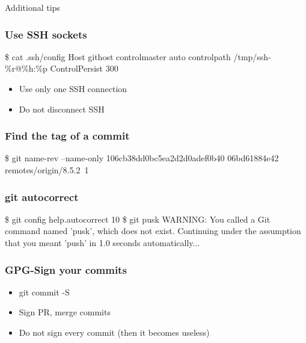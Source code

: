 
\begin{frame}
    \begin{center}
        \Huge{Additional tips}
    \end{center}
\end{frame}
\begin{frame}[fragile]
    \frametitle{Use SSH sockets}
\begin{block}{}\begin{semiverbatim}
\$ cat {}.ssh/config
Host githost
    controlmaster auto
    controlpath /tmp/ssh-\%r@\%h:\%p
    ControlPersist 300
\end{semiverbatim}\end{block}
    \begin{itemize}
        \item Use only one SSH connection
        \item Do not disconnect SSH
    \end{itemize}
\end{frame}
\begin{frame}[fragile]
    \frametitle{Find the tag of a commit}

\begin{block}{}\begin{semiverbatim}
\$ git name-rev --name-only 106cb38dd0bc5ea2d2d0adef0b40
06bd61884e42
\color{lightgrey}remotes/origin/8.5.2~1
\end{semiverbatim}\end{block}
\end{frame}
\begin{frame}[fragile]
    \frametitle{git autocorrect}
\begin{block}{}\begin{semiverbatim}
\$ git config help.autocorrect 10\pause
\$ git pusk
\color{lightgrey}WARNING: You called a Git command named \rq{}pusk\rq{}, which does not exist.
Continuing under the assumption that you meant \rq{}push\rq{}
in 1.0 seconds automatically.{}.{}.
\end{semiverbatim}\end{block}
\end{frame}
\begin{frame}
    \frametitle{GPG-Sign your commits}
    \begin{itemize}
        \item git commit -S
        \item Sign PR, merge commits
        \item Do not sign every commit (then it becomes useless)
    \end{itemize}
\end{frame}

